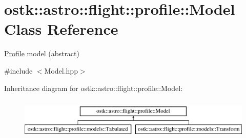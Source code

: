 \hypertarget{classostk_1_1astro_1_1flight_1_1profile_1_1_model}{}\section{ostk\+:\+:astro\+:\+:flight\+:\+:profile\+:\+:Model Class Reference}
\label{classostk_1_1astro_1_1flight_1_1profile_1_1_model}


\hyperlink{classostk_1_1astro_1_1flight_1_1_profile}{Profile} model (abstract)  




{\ttfamily \#include $<$Model.\+hpp$>$}

Inheritance diagram for ostk\+:\+:astro\+:\+:flight\+:\+:profile\+:\+:Model\+:\begin{figure}[H]
\begin{center}
\leavevmode
\includegraphics[height=2.000000cm]{classostk_1_1astro_1_1flight_1_1profile_1_1_model}
\end{center}
\end{figure}
